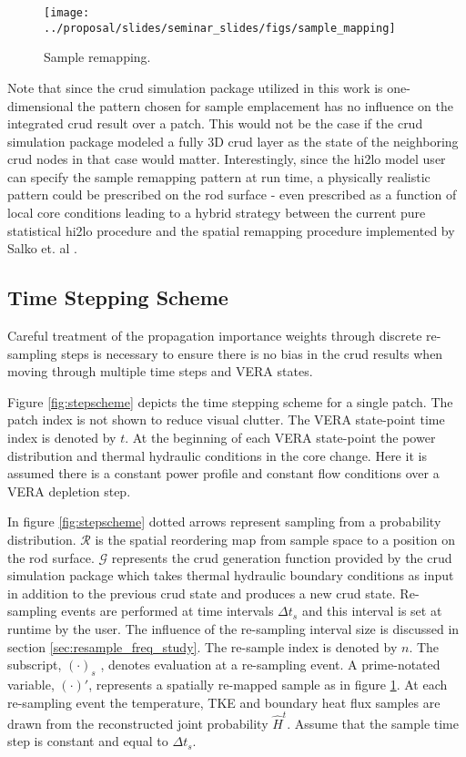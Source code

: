 \begin{figure}[H]
    \centering
    \texttt{[image: ../proposal/slides/seminar\_slides/figs/sample\_mapping]}
    \caption{Sample remapping.}
    \label{fig:samplemapping}
\end{figure}

Note that since the crud simulation package utilized in this work is one-dimensional the pattern chosen for sample emplacement has no influence on the integrated crud result over a patch.  This would not be the case if the crud simulation package modeled a fully 3D crud layer as the state of the neighboring crud nodes in that case would matter.  Interestingly, since the hi2lo model user  can specify the sample remapping pattern at run time, a physically realistic pattern could be prescribed on the rod surface - even prescribed as a function of local core conditions leading to a hybrid strategy between the current pure statistical hi2lo procedure and the spatial remapping procedure implemented by Salko et. al \cite{salko17}.

\subsection{Time Stepping Scheme}

Careful treatment of the propagation importance weights through discrete re-sampling steps is necessary to ensure there is no bias in the crud results when moving through multiple time steps and VERA states.

Figure \ref{fig:stepscheme} depicts the time stepping scheme for a single patch. The patch index is not shown to reduce visual clutter. The VERA state-point time index is denoted by $t$.  At the beginning of each VERA state-point the power distribution and thermal hydraulic conditions in the core change.  Here it is assumed there is a constant power profile and constant flow conditions over a VERA depletion step. 

In figure \ref{fig:stepscheme} dotted arrows represent sampling from a probability distribution.  $\mathcal R$ is the spatial reordering map from sample space to a position on the rod surface. $\mathcal G$ represents the crud generation function provided by the crud simulation package which takes thermal hydraulic boundary conditions as input in addition to the previous crud state and produces a new crud state.  Re-sampling events are performed at time intervals $\Delta t_s$ and this interval is set at runtime by the user.  The influence of the re-sampling interval size is discussed in section \ref{sec:resample_freq_study}.  The re-sample index is denoted by $n$.  The subscript, $(\cdot)_s$ , denotes evaluation at a re-sampling event.  A prime-notated variable,  $(\cdot)'$, represents a spatially re-mapped sample as in figure \ref{fig:samplemapping}.  At each re-sampling event the temperature, TKE and boundary heat flux samples are drawn from the reconstructed joint probability $\hat H^t$.  Assume that the sample time step is constant and equal to $\Delta t_s$.

